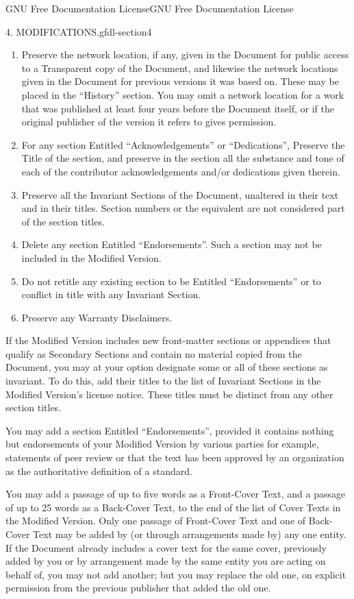 \documentclass[10pt,]{book}
\numberwithin{equation}{section}
\begin{document}
\begin{appendixptx}{GNU Free Documentation License}{}{GNU Free Documentation License}{}{}
\begin{paragraphs}{4. MODIFICATIONS.}{gfdl-section4}
\begin{enumerate}[label=\Alph*.]
\item\hypertarget{li-34}{}\hypertarget{p-551}{}%
Preserve the network location, if any, given in the Document for public access to a Transparent copy of the Document, and likewise the network locations given in the Document for previous versions it was based on.  These may be placed in the ``History'' section. You may omit a network location for a work that was published at least four years before the Document itself, or if the original publisher of the version it refers to gives permission.%
\item\hypertarget{li-35}{}\hypertarget{p-552}{}%
For any section Entitled ``Acknowledgements'' or ``Dedications'', Preserve the Title of the section, and preserve in the section all the substance and tone of each of the contributor acknowledgements and/or dedications given therein.%
\item\hypertarget{li-36}{}\hypertarget{p-553}{}%
Preserve all the Invariant Sections of the Document, unaltered in their text and in their titles. Section numbers or the equivalent are not considered part of the section titles.%
\item\hypertarget{li-37}{}\hypertarget{p-554}{}%
Delete any section Entitled ``Endorsements''. Such a section may not be included in the Modified Version.%
\item\hypertarget{li-38}{}\hypertarget{p-555}{}%
Do not retitle any existing section to be Entitled ``Endorsements'' or to conflict in title with any Invariant Section.%
\item\hypertarget{li-39}{}\hypertarget{p-556}{}%
Preserve any Warranty Disclaimers.%
\end{enumerate}
\hypertarget{p-557}{}%
If the Modified Version includes new front-matter sections or appendices that qualify as Secondary Sections and contain no material copied from the Document, you may at your option designate some or all of these sections as invariant. To do this, add their titles to the list of Invariant Sections in the Modified Version's license notice. These titles must be distinct from any other section titles.%
\par
\hypertarget{p-558}{}%
You may add a section Entitled ``Endorsements'', provided it contains nothing but endorsements of your Modified Version by various parties \textemdash{} for example, statements of peer review or that the text has been approved by an organization as the authoritative definition of a standard.%
\par
\hypertarget{p-559}{}%
You may add a passage of up to five words as a Front-Cover Text, and a passage of up to 25 words as a Back-Cover Text, to the end of the list of Cover Texts in the Modified Version. Only one passage of Front-Cover Text and one of Back-Cover Text may be added by (or through arrangements made by) any one entity. If the Document already includes a cover text for the same cover, previously added by you or by arrangement made by the same entity you are acting on behalf of, you may not add another; but you may replace the old one, on explicit permission from the previous publisher that added the old one.%

\end{paragraphs}
\end{appendixptx}
\end{document}
